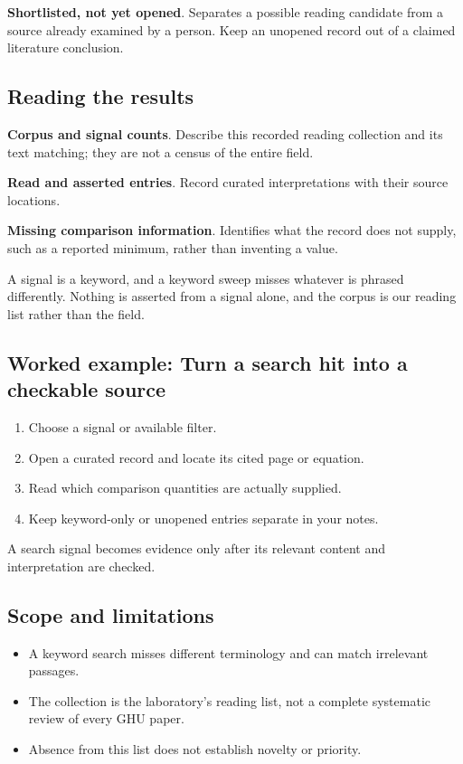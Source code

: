 \documentclass[11pt,a4paper]{article}
\begin{document}
\textbf{Shortlisted, not yet opened}. Separates a possible reading candidate from a source already examined by a person. Keep an unopened record out of a claimed literature conclusion.

\subsection*{Reading the results}
\textbf{Corpus and signal counts}. Describe this recorded reading collection and its text matching; they are not a census of the entire field.

\textbf{Read and asserted entries}. Record curated interpretations with their source locations.

\textbf{Missing comparison information}. Identifies what the record does not supply, such as a reported minimum, rather than inventing a value.

A signal is a keyword, and a keyword sweep misses whatever is phrased differently. Nothing is asserted from a signal alone, and the corpus is our reading list rather than the field.
\subsection*{Worked example: Turn a search hit into a checkable source}
\begin{enumerate}
\item Choose a signal or available filter.
\item Open a curated record and locate its cited page or equation.
\item Read which comparison quantities are actually supplied.
\item Keep keyword-only or unopened entries separate in your notes.
\end{enumerate}
A search signal becomes evidence only after its relevant content and interpretation are checked.
\subsection*{Scope and limitations}
\begin{itemize}
\item A keyword search misses different terminology and can match irrelevant passages.
\item The collection is the laboratory's reading list, not a complete systematic review of every GHU paper.
\item Absence from this list does not establish novelty or priority.
\end{itemize}
\end{document}
